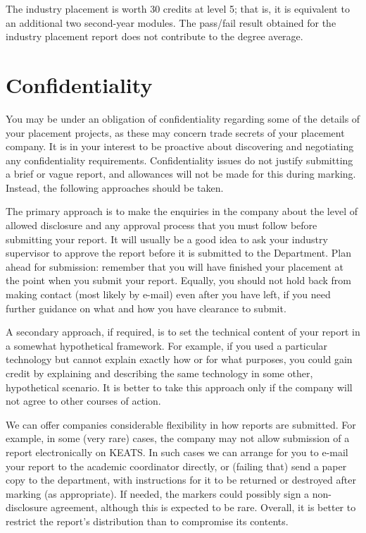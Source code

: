 \documentclass[12pt,a4paper,twoside,openright]{report}
\begin{document}
The industry placement is worth 30 credits at level 5; that is,
it is equivalent to an additional two second-year modules.
The pass/fail result obtained for the industry placement report
does not contribute to the degree average.

\section{Confidentiality}
\label{sec:confidentiality}

You may be under an obligation of confidentiality
regarding some of the details of your placement projects,
as these may concern trade secrets of your placement company.
It is in your interest to be proactive about discovering
and negotiating any confidentiality requirements.
Confidentiality issues do not justify submitting a brief or vague report,
and allowances will not be made for this during marking.
Instead, the following approaches should be taken.

The primary approach is to make the enquiries in the company
about the level of allowed disclosure and any approval process that you must follow
before submitting your report.
It will usually be a good idea to ask your industry supervisor
to approve the report before it is submitted to the Department.
Plan ahead for submission: remember that
you will have finished your placement at the point when you submit your report.
Equally, you should not hold back from making contact
(most likely by e-mail) even after you have left, if you need further guidance
on what and how you have clearance to submit.

A secondary approach, if required, is to set the technical content of your report
in a somewhat hypothetical framework.
For example, if you used a particular technology but cannot explain exactly how or
for what purposes,
you could gain credit by explaining and describing the same technology in some other,
hypothetical scenario.
It is better to take this approach only if the company will not agree to other courses of action.

We can offer companies considerable flexibility in how reports are submitted.
For example, in some (very rare) cases, the company may not allow submission of a
report electronically on KEATS. In such cases we can arrange for you to e-mail your report
to the academic coordinator directly, or (failing that) send a paper copy to the department,
with instructions for it to be returned or destroyed after marking (as appropriate).
If needed, the markers could possibly sign a non-disclosure agreement,
although this is expected to be rare.
Overall, it is better to restrict the report's distribution than to compromise its contents.
\end{document}
